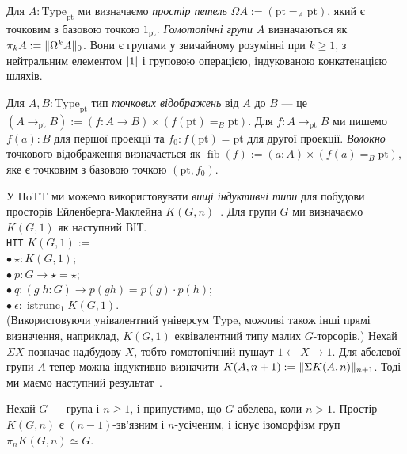 \documentclass[12pt]{article}
\newcommand*{\Loop}{\Omega}
\newcommand*{\concat}{\cdot}
\newcommand*{\susp}[1]{{\Sigma}{#1}}
\newcommand*{\pt}{{\mathrm{pt}}}
\renewcommand*{\equiv}{\mathrel{\simeq}}
\DeclarePairedDelimiter\trunc{\lVert}{\rVert}
\DeclarePairedDelimiter\tr{\lvert}{\rvert}
\DeclareMathOperator\fib{fib}
\DeclareMathOperator\istrunc{istrunc}
\newcommand*{\Type}{\mathrm{Type}}
\begin{document}
Для $A : \Type_\pt$ ми визначаємо \emph{простір петель} $\Loop A := (\pt =_A \pt)$, який є точковим з базовою точкою $1_\pt$. \emph{Гомотопічні групи} $A$ визначаються як $\pi_k A := \trunc{\Loop^k A}_0$. Вони є групами у звичайному розумінні при $k \ge 1$, з нейтральним елементом $\tr{1}$ і груповою операцією, індукованою конкатенацією шляхів.

Для $A, B : \Type_\pt$ тип \emph{точкових відображень} від $A$ до $B$ — це $(A \to_\pt B) := (f : A \to B) \times (f(\pt) =_B \pt)$. Для $f : A \to_\pt B$ ми пишемо $f(a) : B$ для першої проекції та $f_0 : f(\pt) = \pt$ для другої проекції. \emph{Волокно} точкового відображення визначається як $\fib(f) := (a : A) \times (f(a) =_B \pt)$, яке є точковим з базовою точкою $(\pt, f_0)$.

У HoTT ми можемо використовувати \emph{вищі індуктивні типи} для побудови просторів Ейленберга-Маклейна $K(G,n)$~\cite{FinsterLicata2014}. Для групи $G$ ми визначаємо $K(G,1)$ як наступний ВІТ.\\
\indent \texttt{HIT} $K(G,1) :=$ \\
\indent $\bullet\ \star : K(G,1)$; \\
\indent $\bullet\ p : G \to \star = \star$; \\
\indent $\bullet\ q : (g\;h : G) \to p(gh) = p(g) \concat p(h)$; \\
\indent $\bullet\ \epsilon : \istrunc_1 K(G,1)$. \\
(Використовуючи унівалентний універсум $\Type$, можливі також інші прямі визначення, наприклад, $K(G,1)$ еквівалентний типу малих $G$-торсорів.)
Нехай $\susp X$ позначає надбудову $X$, тобто гомотопічний пушаут $1 \leftarrow X \to 1$. Для абелевої групи $A$ тепер можна індуктивно визначити $K(A,n+1) := \trunc{\susp K(A,n)}_{n+1}$. Тоді ми маємо наступний результат~\cite{FinsterLicata2014}.

\begin{theorem}\label{thm:EM-spaces}
  Нехай $G$ — група і $n \ge 1$, і припустимо, що $G$ абелева, коли $n > 1$. Простір $K(G,n)$ є $(n-1)$-зв'язним і $n$-усіченим, і існує ізоморфізм груп $\pi_n K(G,n) \equiv G$.
\end{theorem}
\end{document}
